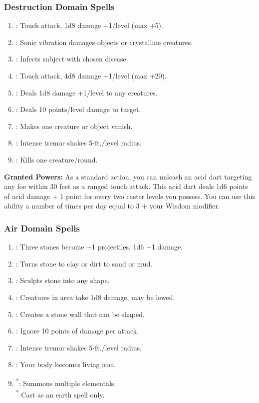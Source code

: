 \subsubsection{Destruction Domain Spells}
\begin{enumerate}
	\item{:} Touch attack, 1d8 damage +1/level (max +5).
	\item{:} Sonic vibration damages objects or crystalline creatures.
	\item{:} Infects subject with chosen disease.
	\item{:} Touch attack, 4d8 damage +1/level (max +20).
	\item{:} Deals 1d8 damage +1/level to any creatures.
	\item{:} Deals 10 points/level damage to target.
	\item{:} Makes one creature or object vanish.
	\item{:} Intense tremor shakes 5-ft./level radius.
	\item{:} Kills one creature/round.
\end{enumerate}

\textbf{Granted Powers:} As a standard action, you can unleash an acid dart targeting any foe within 30 feet as a ranged touch attack. This acid dart deals 1d6 points of acid damage + 1 point for every two caster levels you possess. You can use this ability a number of times per day equal to 3 + your Wisdom modifier.
\subsubsection{Air Domain Spells}
\begin{enumerate}
	\item{:} Three stones become +1 projectiles, 1d6 +1 damage.
	\item{:} Turns stone to clay or dirt to sand or mud.
	\item{:} Sculpts stone into any shape.
	\item{:} Creatures in area take 1d8 damage, may be lowed.
	\item{:} Creates a stone wall that can be shaped.
	\item{:} Ignore 10 points of damage per attack.
	\item{:} Intense tremor shakes 5-ft./level radius.
	\item{:} Your body becomes living iron.
	\item{\textsuperscript{*}:} Summons multiple elementals.
	\\ \textsuperscript{*} Cast as an earth spell only.
\end{enumerate}

